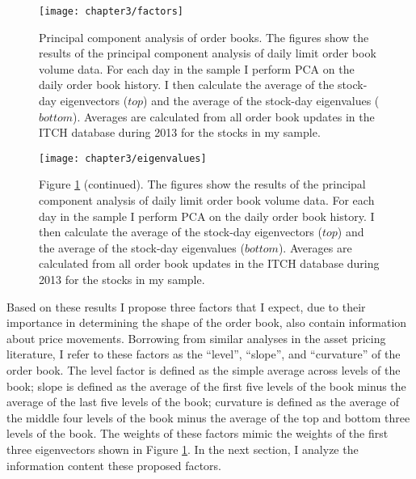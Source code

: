 	\begin{figure}[p]
		\linespread{1}
		\centering
		\texttt{[image: chapter3/factors]}
		\captionsetup{skip=-20pt, font=footnotesize, justification=justified, width=\linewidth}
		\caption[Principal component analysis of order books]{Principal component analysis of order books. The figures show the results of the principal component analysis of daily limit order book volume data. For each day in the sample I perform PCA on the daily order book history. I then calculate the average of the stock-day eigenvectors ($top$) and the average of the stock-day eigenvalues ($bottom$). Averages are calculated from all order book updates in the ITCH database during 2013 for the stocks in my sample.}
		\label{fig:pca}
	\end{figure}

	\begin{figure}[t]
		\linespread{1}
		\centering
		\texttt{[image: chapter3/eigenvalues]}
		\captionsetup{skip=-20pt, font=footnotesize, justification=justified, width=\linewidth}
		\caption*{Figure \ref{fig:pca} (continued). The figures show the results of the principal component analysis of daily limit order book volume data. For each day in the sample I perform PCA on the daily order book history. I then calculate the average of the stock-day eigenvectors ($top$) and the average of the stock-day eigenvalues ($bottom$). Averages are calculated from all order book updates in the ITCH database during 2013 for the stocks in my sample.}
	\end{figure}

	Based on these results I propose three factors that I expect, due to their importance in determining the shape of the order book, also contain information about price movements. Borrowing from similar analyses in the asset pricing literature, I refer to these factors as the ``level'', ``slope'', and ``curvature'' of the order book. The level factor is defined as the simple average across levels of the book; slope is defined as the average of the first five levels of the book minus the average of the last five levels of the book; curvature is defined as the average of the middle four levels of the book minus the average of the top and bottom three levels of the book. The weights of these factors mimic the weights of the first three eigenvectors shown in Figure \ref{fig:pca}. In the next section, I analyze the information content these proposed factors.


